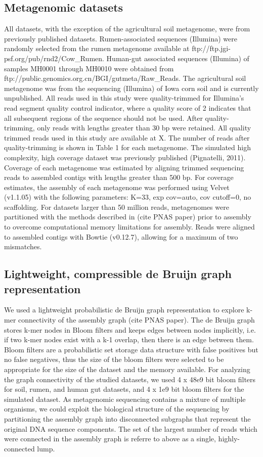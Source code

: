 \documentclass[11pt]{article} %
\begin{document}
\subsection{Metagenomic datasets}
All datasets, with the exception of the agricultural soil metagenome, were from
previously published datasets. Rumen-associated sequences (Illumina)
were randomly selected from the rumen metagenome available at ftp://ftp.jgi-psf.org/pub/rnd2/Cow\_Rumen. Human-gut associated sequences (Illumina) of samples MH0001 through MH0010 were obtained from ftp://public.genomics.org.cn/BGI/gutmeta/Raw\_Reads. The agricultural
soil metagenome was from the sequencing (Illumina) of Iowa corn soil and is currently unpublished. All reads used in this study were quality-trimmed for Illumina's read segment quality control indicator, where a quality score of 2 indicates that all subsequent
regions of the sequence should not be used. After quality-trimming,
only reads with lengths greater than 30 bp were retained. All quality
trimmed reads used in this study are available at X.  The number of reads after quality-trimming is shown in Table 1 for each metagenome. The simulated high complexity, high coverage
dataset was previously published (Pignatelli, 2011).  
	Coverage of each metagenome was estimated by aligning trimmed sequencing reads to assembled contigs with lengths greater than 500 bp.  For coverage estimates, the assembly of each metagenome was performed using Velvet (v1.1.05) with the following parameters:  K=33, exp cov=auto, cov cutoff=0, no scaffolding.  For datasets larger than 50 million reads, metagenomes were partitioned with the methods described in (cite PNAS paper) prior to assembly to overcome computational memory limitations for assembly.  Reads were aligned to assembled contigs with Bowtie (v0.12.7), allowing for a maximum of two mismatches.  

\subsection{Lightweight, compressible de Bruijn graph representation}
We used a lightweight probabilistic de Bruijn graph representation
to explore k-mer connectivity of the assembly graph (cite PNAS paper).
The de Bruijn graph stores k-mer nodes in Bloom filters and keeps
edges between nodes implicitly, i.e. if two k-mer nodes exist with
a k-1 overlap, then there is an edge between them. Bloom filters are
a probabilistic set storage data structure with false positives but
no false negatives, thus the size of the bloom filters were selected
to be appropriate for the size of the dataset and the memory available.
	For analyzing the graph connectivity of the studied datasets, we used
4 x 48e9 bit bloom filters for soil, rumen, and human gut datasets,
and 4 x 1e9 bit bloom filters for the simulated dataset. As metagenomic sequencing contains a mixture of multiple organisms, we
could exploit the biological structure of the sequencing by partitioning
the assembly graph into disconnected subgraphs that represent the
original DNA sequence components. The set of the largest number of
reads which were connected in the assembly graph is referre to above as a single, highly-connected lump. 
\end{document}
